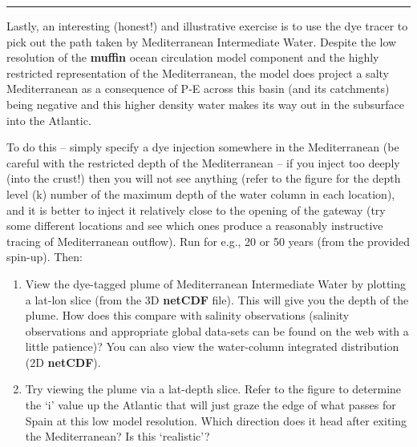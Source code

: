 \vspace{1mm}
\noindent\rule{4cm}{0.5pt}
\vspace{2mm}

\noindent Lastly, an interesting (honest!) and illustrative exercise is to use the dye tracer to pick out the path taken by Mediterranean Intermediate Water. Despite the low resolution of the \textbf{muffin} ocean circulation model component and the highly restricted representation of the Mediterranean, the model does project a salty Mediterranean as a consequence of  P-E across this basin (and its catchments) being negative and this higher density water makes its way out in the subsurface into the Atlantic.

To do this -- simply specify a dye injection somewhere in the Mediterranean (be careful with the restricted depth of the Mediterranean – if you inject too deeply (into the crust!) then you will not see anything (refer to the figure for the depth level (k) number of the maximum depth of the water column in each location), and it is better to inject it relatively close to the opening of the gateway (try some different locations and see which ones produce a reasonably instructive tracing of Mediterranean outflow). Run for e.g., 20 or 50 years (from the provided spin-up). Then:

\vspace{1mm}
\begin{enumerate}[noitemsep]
\vspace{1mm}
\item View the dye-tagged plume of Mediterranean Intermediate Water by plotting a lat-lon slice (from the 3D \textbf{netCDF} file). This will give you the depth of the plume. How does this compare with salinity observations (salinity observations and appropriate global data-sets can be found on the web with a little patience)? You can also view the water-column integrated distribution (2D \textbf{netCDF}).
\vspace{1mm}
\item Try viewing the plume via a lat-depth slice. Refer to the figure to determine the ‘i’ value up the Atlantic that will just graze the edge of what passes for Spain at this low model resolution. Which direction does it head after exiting the Mediterranean? Is this ‘realistic’?
\end{enumerate}
\vspace{1mm}

